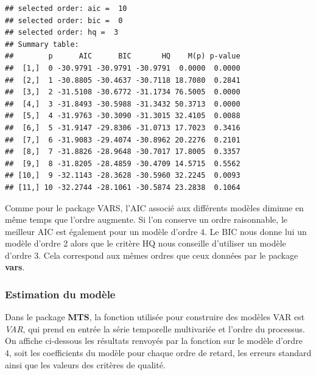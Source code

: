 \documentclass[11pt,]{article}
\begin{document}
\begin{verbatim}
## selected order: aic =  10 
## selected order: bic =  0 
## selected order: hq =  3 
## Summary table:  
##        p      AIC      BIC       HQ    M(p) p-value
##  [1,]  0 -30.9791 -30.9791 -30.9791  0.0000  0.0000
##  [2,]  1 -30.8805 -30.4637 -30.7118 18.7080  0.2841
##  [3,]  2 -31.5108 -30.6772 -31.1734 76.5005  0.0000
##  [4,]  3 -31.8493 -30.5988 -31.3432 50.3713  0.0000
##  [5,]  4 -31.9763 -30.3090 -31.3015 32.4105  0.0088
##  [6,]  5 -31.9147 -29.8306 -31.0713 17.7023  0.3416
##  [7,]  6 -31.9083 -29.4074 -30.8962 20.2276  0.2101
##  [8,]  7 -31.8826 -28.9648 -30.7017 17.8005  0.3357
##  [9,]  8 -31.8205 -28.4859 -30.4709 14.5715  0.5562
## [10,]  9 -32.1143 -28.3628 -30.5960 32.2245  0.0093
## [11,] 10 -32.2744 -28.1061 -30.5874 23.2838  0.1064
\end{verbatim}

Comme pour le package VARS, l'AIC associé aux différents modèles diminue
en même temps que l'ordre augmente. Si l'on conserve un ordre
raisonnable, le meilleur AIC est également pour un modèle d'ordre 4. Le
BIC nous donne lui un modèle d'ordre 2 alors que le critère HQ nous
conseille d'utiliser un modèle d'ordre 3. Cela correspond aux mêmes
ordres que ceux données par le package \textbf{vars}.

\subsubsection{Estimation du modèle}\label{estimation-du-modele}

Dans le package \textbf{MTS}, la fonction utilisée pour construire des
modèles VAR est \emph{VAR}, qui prend en entrée la série temporelle
multivariée et l'ordre du processus. On affiche ci-dessous les résultats
renvoyés par la fonction sur le modèle d'ordre 4, soit les coefficients
du modèle pour chaque ordre de retard, les erreurs standard ainsi que
les valeurs des critères de qualité.
\end{document}
